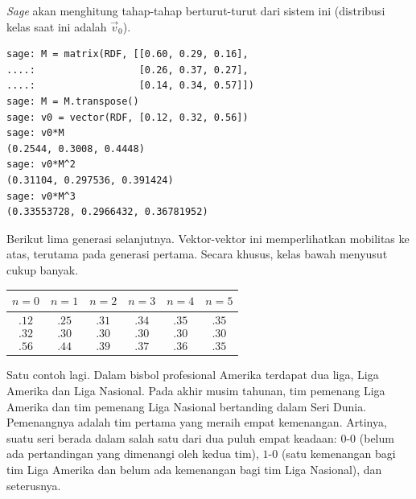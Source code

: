 \textit{Sage} akan menghitung tahap-tahap berturut-turut dari sistem ini
(distribusi kelas saat ini adalah $\vec{v}_0$).
\begin{lstlisting}
sage: M = matrix(RDF, [[0.60, 0.29, 0.16],
....:                  [0.26, 0.37, 0.27],
....:                  [0.14, 0.34, 0.57]])
sage: M = M.transpose()
sage: v0 = vector(RDF, [0.12, 0.32, 0.56])
sage: v0*M
(0.2544, 0.3008, 0.4448)
sage: v0*M^2
(0.31104, 0.297536, 0.391424)
sage: v0*M^3
(0.33553728, 0.2966432, 0.36781952)  
\end{lstlisting}
Berikut lima generasi selanjutnya.
Vektor-vektor ini memperlihatkan mobilitas ke atas, terutama pada generasi
pertama. Secara khusus, kelas bawah menyusut cukup banyak.
\begin{center}
  \begin{tabular}{c|ccccc}
    $n=0$  &$n=1$  &$n=2$  &$n=3$  &$n=4$  &$n=5$  \\ \hline
    $\begin{array}{l}
               .12 \\ .32  \\ .56
      \end{array}$
    &$\begin{array}{l}
               .25 \\ .30  \\ .44
       \end{array}$
    &$\begin{array}{l}
               .31 \\ .30  \\ .39  
       \end{array}$
    &$\begin{array}{l}
               .34 \\ .30  \\ .37  
       \end{array}$
    &$\begin{array}{l}
               .35 \\ .30 \\ .36  
       \end{array}$
    &$\begin{array}{l}
               .35 \\ .30  \\ .35  
       \end{array}$
  \end{tabular}
\end{center}

Satu contoh lagi.
Dalam bisbol profesional Amerika terdapat dua liga, Liga Amerika dan Liga
Nasional. Pada akhir musim tahunan, tim pemenang Liga Amerika dan tim pemenang
Liga Nasional bertanding dalam Seri Dunia.
Pemenangnya adalah tim pertama yang meraih empat kemenangan.
Artinya, suatu seri berada dalam salah satu dari dua puluh empat keadaan:
$0$-$0$ (belum ada pertandingan yang dimenangi oleh kedua tim),
$1$-$0$ (satu kemenangan bagi tim Liga Amerika dan belum ada kemenangan bagi
tim Liga Nasional), dan seterusnya.

